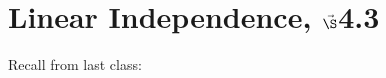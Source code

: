 


%

%

\section{{Linear Independence, $\vec\S$4.3}}%
% 

%
\thispagestyle{fancy}

Recall from last class:

